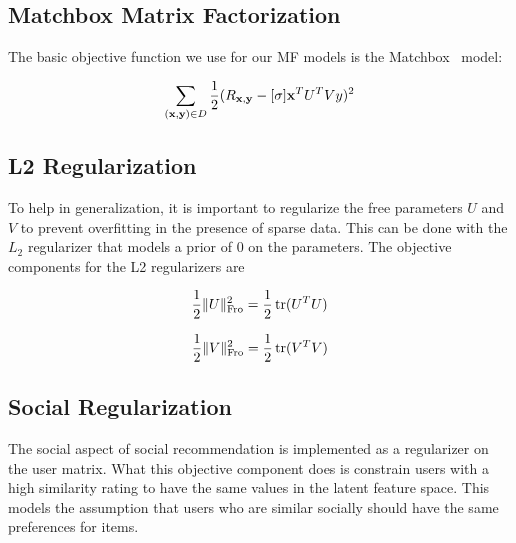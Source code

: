 \subsection{Matchbox Matrix Factorization}

The basic objective function we use for our MF models is the Matchbox~\cite{matchbox} model:

\begin{align}
\sum_{(\mathbf{x},\mathbf{y}) \in D} \frac{1}{2} (R_{\mathbf{x},\mathbf{y}} - [\sigma] \mathbf{x}^T U^T V y)^2
\end{align}

\subsection{L2 Regularization}

To help in generalization, it is important to regularize the free parameters $U$ and $V$ to prevent overfitting in
the presence of sparse data. This can be done with the
$L_2$ regularizer that models a prior of $0$ on the parameters. The objective components for the L2 regularizers are

\begin{align}
\frac{1}{2} \| U \|_{\mathrm{Fro}}^2 = \frac{1}{2} \operatorname{tr}(U^T U)
\end{align}

\begin{align}
\frac{1}{2} \| V \|_{\mathrm{Fro}}^2 = \frac{1}{2} \operatorname{tr}(V^T V)
\end{align}

\subsection{Social Regularization}
\label{sec:SocRec}
The social aspect of social recommendation is implemented as a regularizer on the user matrix. What this objective component does is constrain users with a high similarity rating to have the same values in the latent feature space. This models the assumption that users who are similar socially should have the same preferences for items.
\\

